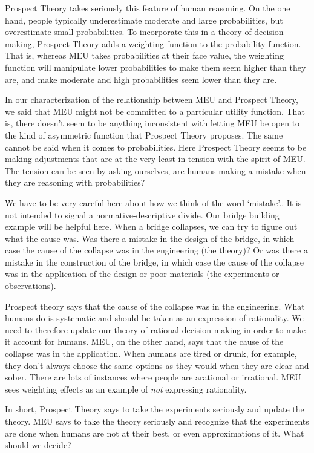 \documentclass[]{tufte-book}
\begin{document}
Prospect Theory takes seriously this feature of human reasoning. On the one hand, people typically underestimate moderate and large probabilities, but overestimate small probabilities. To incorporate this in a theory of decision making, Prospect Theory adds a weighting function to the probability function. That is, whereas MEU takes probabilities at their face value, the weighting function will manipulate lower probabilities to make them seem higher than they are, and make moderate and high probabilities seem lower than they are.

In our characterization of the relationship between MEU and Prospect Theory, we said that MEU might not be committed to a particular utility function. That is, there doesn't seem to be anything inconsistent with letting MEU be open to the kind of asymmetric function that Prospect Theory proposes. The same cannot be said when it comes to probabilities. Here Prospect Theory seems to be making adjustments that are at the very least in tension with the spirit of MEU. The tension can be seen by asking ourselves, are humans making a mistake when they are reasoning with probabilities?

We have to be very careful here about how we think of the word `mistake'.. It is not intended to signal a normative-descriptive divide. Our bridge building example will be helpful here. When a bridge collapses, we can try to figure out what the cause was. Was there a mistake in the design of the bridge, in which case the cause of the collapse was in the engineering (the theory)? Or was there a mistake in the construction of the bridge, in which case the cause of the collapse was in the application of the design or poor materials (the experiments or observations).

Prospect theory says that the cause of the collapse was in the engineering. What humans do is systematic and should be taken as an expression of rationality. We need to therefore update our theory of rational decision making in order to make it account for humans. MEU, on the other hand, says that the cause of the collapse was in the application. When humans are tired or drunk, for example, they don't always choose the same options as they would when they are clear and sober. There are lots of instances where people are arational or irrational. MEU sees weighting effects as an example of \emph{not} expressing rationality.

In short, Prospect Theory says to take the experiments seriously and update the theory. MEU says to take the theory seriously and recognize that the experiments are done when humans are not at their best, or even approximations of it. What should we decide?
\end{document}
